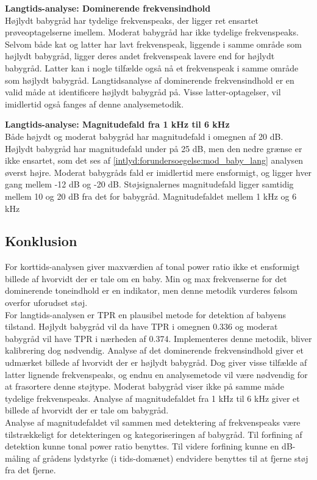 \textbf{Langtids-analyse: Dominerende frekvensindhold}	\\
Højlydt babygråd har tydelige frekvenspeaks, der ligger ret ensartet prøveoptagelserne imellem. Moderat babygråd har ikke tydelige frekvenspeaks. Selvom både kat og latter har lavt frekvenspeak, liggende i samme område som højlydt babygråd, ligger deres andet frekvenspeak lavere end for højlydt babygråd. Latter kan i nogle tilfælde også nå et frekvenspeak i samme område som højlydt babygråd. Langtidsanalyse af dominerende frekvensindhold er en valid måde at identificere højlydt babygråd på. Visse latter-optagelser, vil imidlertid også fanges af denne analysemetodik.

\textbf{Langtids-analyse: Magnitudefald fra 1 kHz til 6 kHz}	\\
Både højydt og moderat babygråd har magnitudefald i omegnen af 20 dB. Højlydt babygråd har magnitudefald under på 25 dB, men den nedre grænse er ikke ensartet, som det ses af \ref{intlyd:forundersoegelse:mod_baby_lang} analysen øverst højre. Moderat babygråds fald er imidlertid mere ensformigt, og ligger hver gang mellem -12 dB og -20 dB. Støjsignalernes magnitudefald ligger samtidig mellem 10 og 20 dB fra det for babygråd. Magnitudefaldet mellem 1 kHz og 6 kHz

\newpage
\subsection*{Konklusion}
For korttids-analysen giver maxværdien af tonal power ratio ikke et ensformigt billede af hvorvidt der er tale om en baby. Min og max frekvenserne for det dominerende toneindhold er en indikator, men denne metodik vurderes følsom overfor uforudset støj. \\
For langtids-analysen er TPR en plausibel metode for detektion af babyens tilstand. Højlydt babygråd vil da have TPR i omegnen 0.336 og moderat babygråd vil have TPR i nærheden af 0.374. Implementeres denne metodik, bliver kalibrering dog nødvendig. Analyse af det dominerende frekvensindhold giver et udmærket billede af hvorvidt der er højlydt babygråd. Dog giver visse tilfælde af latter lignende frekvenspeaks, og endnu en analysemetode vil være nødvendig for at frasortere denne støjtype. Moderat babygråd viser ikke på samme måde tydelige frekvenspeaks. Analyse af magnitudefaldet fra 1 kHz til 6 kHz giver et billede af hvorvidt der er tale om babygråd. \\
Analyse af magnitudefaldet vil sammen med detektering af frekvenspeaks være tilstrækkeligt for detekteringen og kategoriseringen af babygråd. Til forfining af detektion kunne tonal power ratio benyttes. Til videre forfining kunne en dB-måling af grådens lydstyrke (i tids-domænet) endvidere benyttes til at fjerne støj fra det fjerne. 